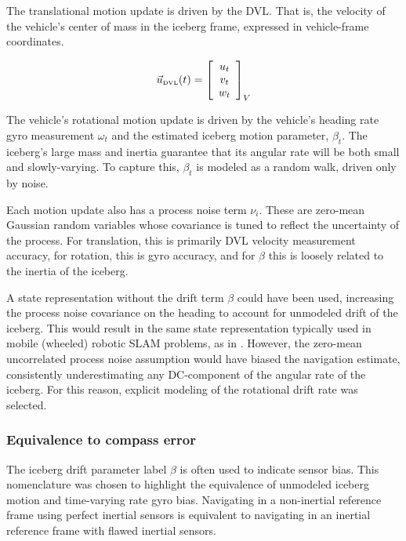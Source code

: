 The translational motion update is driven by the DVL. That is, the velocity of the vehicle's center of mass in the iceberg frame, expressed in vehicle-frame coordinates. 

\begin{equation}
\vec{u}_\text{\tiny{DVL}}(t) = 
                    \left[\begin{array}{c}
                     u_t \\ v_t \\ w_t 
                     \end{array}\right]_V
\end{equation}

The vehicle's rotational motion update is driven by the vehicle's heading rate gyro measurement $\omega_t$ and the estimated iceberg motion parameter, $\beta_t$.  The iceberg's large mass and inertia guarantee that its angular rate will be both small and slowly-varying. To capture this, $\beta_t$ is modeled as a random walk, driven only by noise.

Each motion update also has a process noise term $\nu_i$. These are zero-mean Gaussian random variables whose covariance is tuned to reflect the uncertainty of the process. For translation, this is primarily DVL velocity measurement accuracy, for rotation, this is gyro accuracy, and for $\beta$ this is loosely related to the inertia of the iceberg. 

A state representation without the drift term $\beta$ could have been used, increasing the process noise covariance on the heading to account for unmodeled drift of the iceberg. This would result in the same state representation typically used in mobile (wheeled) robotic SLAM problems, as in \cite{ProbRob}. However, the zero-mean uncorrelated process noise assumption would have biased the navigation estimate, consistently underestimating any DC-component of the angular rate of the iceberg. For this reason, explicit modeling of the rotational drift rate was selected.

\subsubsection{Equivalence to compass error}

The iceberg drift parameter label $\beta$ is often used to indicate sensor bias. This nomenclature was chosen to highlight the equivalence of unmodeled iceberg motion and time-varying rate gyro bias. Navigating in a non-inertial reference frame using perfect inertial sensors is equivalent to navigating in an inertial reference frame with flawed inertial sensors. 


